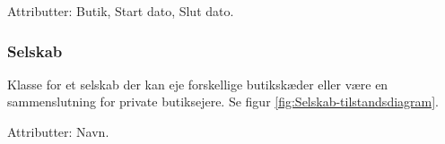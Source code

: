 Attributter: Butik, Start dato, Slut dato.








\subsubsection{Selskab}
Klasse for et selskab der kan eje forskellige butikskæder eller være en sammenslutning for private butiksejere. Se figur \ref{fig:Selskab-tilstandsdiagram}.

Attributter: Navn.








